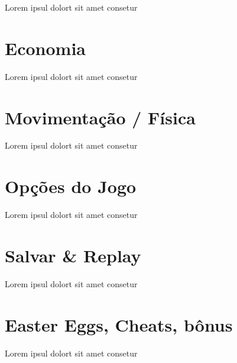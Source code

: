 Lorem ipsul dolort sit amet consetur

\section{Economia}

Lorem ipsul dolort sit amet consetur

\section{Movimentação / Física}

Lorem ipsul dolort sit amet consetur

\section{Opções do Jogo}

Lorem ipsul dolort sit amet consetur

\section{Salvar \& Replay}

Lorem ipsul dolort sit amet consetur

\section{Easter Eggs, Cheats, bônus}

Lorem ipsul dolort sit amet consetur